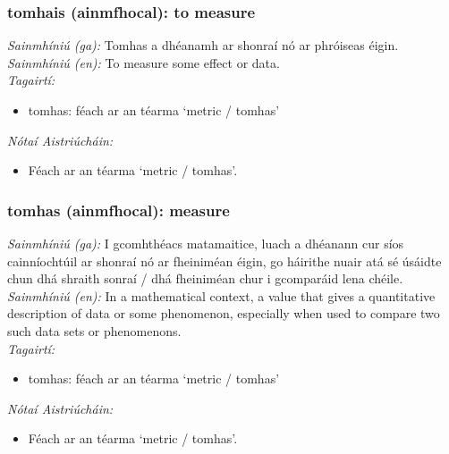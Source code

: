 \documentclass{article}
\begin{document}
\subsubsection*{tomhais (ainmfhocal): to measure}
 \noindent \textit{Sainmhíniú (ga):} Tomhas a dhéanamh ar shonraí nó ar phróiseas éigin.
\\
 \noindent \textit{Sainmhíniú (en):} To measure some effect or data.
\\
 \noindent \textit{Tagairtí:}
\begin{itemize}
	\item tomhas: féach ar an téarma `metric / tomhas'
\end{itemize}

 \noindent \textit{Nótaí Aistriúcháin:}
\begin{itemize}
	\item Féach ar an téarma `metric / tomhas'.
\end{itemize}


\subsubsection*{tomhas (ainmfhocal): measure}
 \noindent \textit{Sainmhíniú (ga):} I gcomhthéacs matamaitice, luach a dhéanann cur síos cainníochtúil ar shonraí nó ar fheiniméan éigin, go háirithe nuair atá sé úsáidte chun dhá shraith sonraí / dhá fheiniméan chur i gcomparáid lena chéile.
\\
 \noindent \textit{Sainmhíniú (en):} In a mathematical context, a value that gives a quantitative description of data or some phenomenon, especially when used to compare two such data sets or phenomenons.
\\
 \noindent \textit{Tagairtí:}
\begin{itemize}
	\item tomhas: féach ar an téarma `metric / tomhas'
\end{itemize}

 \noindent \textit{Nótaí Aistriúcháin:}
\begin{itemize}
	\item Féach ar an téarma `metric / tomhas'.
\end{itemize}
\end{document}
